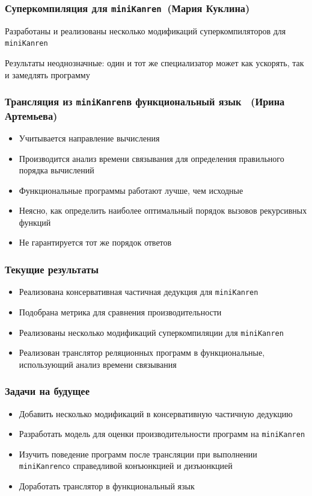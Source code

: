 \documentclass{beamer}
\newcommand{\miniKanren}{\texttt{miniKanren}}
\begin{document}
\begin{frame}[fragile]
  \frametitle{Суперкомпиляция для \miniKanren \ (Мария Куклина)}
  \begin{center}
    Разработаны и реализованы несколько модификаций суперкомпиляторов для \miniKanren
  \end{center}

  \begin{center}
    Результаты неоднозначные: один и тот же специализатор может как ускорять, так и замедлять программу
  \end{center}
\end{frame}

\begin{frame}[fragile]
  \frametitle{Трансляция из \miniKanren в функциональный язык \ (Ирина Артемьева)}

\begin{itemize}
  \item Учитывается направление вычисления
  \item Производится анализ времени связывания для определения правильного порядка вычислений
\end{itemize}

\begin{itemize}
  \item Функциональные программы работают лучше, чем исходные
  \item Неясно, как определить наиболее оптимальный порядок вызовов рекурсивных функций
  \item Не гарантируется тот же порядок ответов
\end{itemize}

\end{frame}

\begin{frame}[fragile]
  \frametitle{Текущие результаты}
\begin{itemize}
  \item Реализована консервативная частичная дедукция для \miniKanren
  \item Подобрана метрика для сравнения производительности
  \item Реализованы несколько модификаций суперкомпиляции для \miniKanren
  \item Реализован транслятор реляционных программ в функциональные, использующий анализ времени связывания
\end{itemize}
\end{frame}

\begin{frame}[fragile]
  \frametitle{Задачи на будущее}
  \begin{itemize}
    \item Добавить несколько модификаций в консервативную частичную дедукцию
    \item Разработать модель для оценки производительности программ на \miniKanren
    \item Изучить поведение программ после трансляции при выполнении \miniKanren со справедливой конъюнкцией и дизъюнкцией
    \item Доработать транслятор в функциональный язык
  \end{itemize}
\end{frame}
\end{document}
